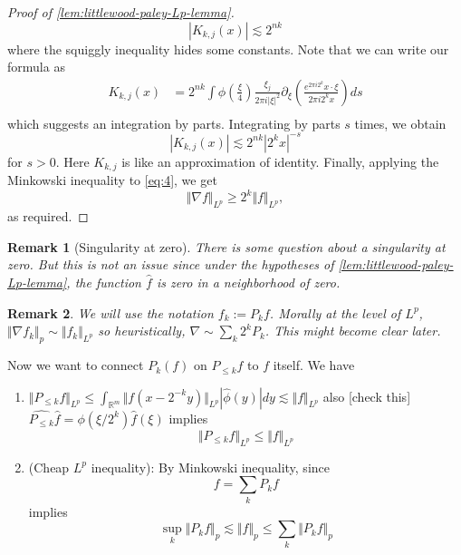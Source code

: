 \documentclass{article}
\def\red{\color{Red}}
\newcommand{\rnote}[1]{{\red [#1] }} %
\newtheorem{remark}{Remark}
\def\R{\mathbb{R}} %
\newcommand{\norm}[1]{\Vert #1 \Vert }
\begin{document}
\begin{proof}[Proof of \cref{lem:littlewood-paley-Lp-lemma}]
\begin{equation*}
    \left| K_{k,j}(x) \right| \lesssim 2^{nk}
  \end{equation*}
  where the squiggly inequality hides some constants. Note that we can write our
  formula as
  \begin{align*}
    K_{k,j}(x) 
    &=2^{nk} \int \phi \left( \frac{\xi}{4} \right)\frac{\xi_{j}}{2\pi i |\xi|^{2}}\partial_{\xi} \left( \frac{e^{2 \pi i 2^{k}}x\cdot\xi}{2 \pi i 2^{k} x} \right)   ds\\
  \end{align*}
  which suggests an integration by parts. Integrating by parts $s$ times, we obtain
  \begin{equation*}
    \left| K_{k,j}(x) \right| \lesssim 2^{nk} \left| 2^{k}x \right|^{-s}
  \end{equation*}
  for $s>0$. Here $K_{k,j}$ is like an approximation of identity. Finally,
  applying the Minkowski inequality to \cref{eq:4}, we get
  \begin{equation*}
    \norm{\nabla f}_{L^{p}}\geq 2^{k} \norm{f}_{L^{p}},
  \end{equation*}
  as required.
\end{proof}

\begin{remark}[Singularity at zero]
  There is some question about a singularity at zero. But this is not an issue
  since under the hypotheses of \cref{lem:littlewood-paley-Lp-lemma}, the
  function $\hat{f}$ is zero in a neighborhood of zero. 
\end{remark}

\begin{remark}
  We will use the notation $f_{k}:=P_{k}f$. Morally at the level of $L^{p}$,
  $ \norm{\nabla f_{k}}_{p}\sim \norm{f_{k}}_{L^{p}}$ so heuristically,
  $\nabla\sim \sum_{k}2^{k}P_{k}$. This might become clear later.
\end{remark}

Now we want to connect $P_{k}(f)$ on $P_{ \leq k}f$ to $f$ itself. We have
\begin{enumerate}
  \item
  $\norm{P_{ \leq k}f}_{L^{p}}\leq \int_{\R^m} \norm{f(x-2^{-k}y)}_{L^{p}}
  \left| \widehat{\phi}(y) \right|dy \lesssim \norm{f}_{L^{p}}$ also
  \rnote{check this}
  $\widehat{P_{ \leq k}}\widehat{f} = \phi(\xi/2^{k})\hat{f}(\xi)$ implies
  \begin{equation}\label{eq:6}
    \norm{P_{ \leq k}f}_{L^{p}} \leq \norm{f}_{L^{p}}
  \end{equation}
  \item (Cheap $L^{p}$ inequality): By Minkowski inequality, since
  \begin{equation*}
    f= \sum_{k} P_{k}f 
  \end{equation*}
  implies
  \begin{equation*}
    \sup_{k} \norm{P_{k}f}_{p} \lesssim \norm{f}_{p} \leq \sum_{k}\norm{P_{k}f}_{p} 
  \end{equation*}
\end{enumerate}
\end{document}

